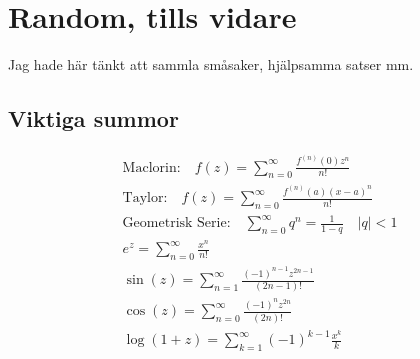 \section{Random, tills vidare}
Jag hade här tänkt att sammla småsaker, hjälpsamma satser mm. 

\subsection{Viktiga summor}
\begin{align*}
	\text{Maclorin:} \quad f(z) = \sum_{n=0}^{\infty} \frac{f^{(n)}(0)z^n}{n!} \\
	\text{Taylor:} \quad f(z) = \sum_{n=0}^{\infty} \frac{f^{(n)}(a)(x-a)^n}{n!} \\ 
	\text{Geometrisk Serie:} \quad  \sum_{n=0}^{\infty}q^n = \frac{1}{1-q} \quad |q|<1 \\
	e^z = \sum_{n=0}^{\infty} \frac{x^n}{n!} \\
	\sin(z) = \sum_{n=1}^{\infty} \frac{(-1)^{n-1}z^{2n-1}}{(2n-1)!} \\ 	
	\cos(z) = \sum_{n=0}^{\infty} \frac{(-1)^{n}z^{2n}}{(2n)!} \\
	\log(1+z) = \sum_{k=1}^{\infty} (-1)^{k-1}\frac{x^k}{k}
\end{align*}

